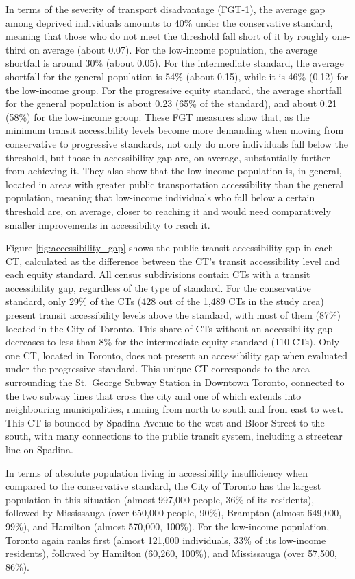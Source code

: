 \documentclass[preprint, 3p,
authoryear]{elsarticle} %
\begin{document}
In terms of the severity of transport disadvantage (FGT-1), the average
gap among deprived individuals amounts to 40\% under the conservative
standard, meaning that those who do not meet the threshold fall short of
it by roughly one-third on average (about 0.07). For the low-income
population, the average shortfall is around 30\% (about 0.05). For the
intermediate standard, the average shortfall for the general population
is 54\% (about 0.15), while it is 46\% (0.12) for the low-income group.
For the progressive equity standard, the average shortfall for the
general population is about 0.23 (65\% of the standard), and about 0.21
(58\%) for the low-income group. These FGT measures show that, as the
minimum transit accessibility levels become more demanding when moving
from conservative to progressive standards, not only do more individuals
fall below the threshold, but those in accessibility gap are, on
average, substantially further from achieving it. They also show that
the low-income population is, in general, located in areas with greater
public transportation accessibility than the general population, meaning
that low-income individuals who fall below a certain threshold are, on
average, closer to reaching it and would need comparatively smaller
improvements in accessibility to reach it.

Figure \ref{fig:accessibility_gap} shows the public transit
accessibility gap in each CT, calculated as the difference between the
CT's transit accessibility level and each equity standard. All census
subdivisions contain CTs with a transit accessibility gap, regardless of
the type of standard. For the conservative standard, only 29\% of the
CTs (428 out of the 1,489 CTs in the study area) present transit
accessibility levels above the standard, with most of them (87\%)
located in the City of Toronto. This share of CTs without an
accessibility gap decreases to less than 8\% for the intermediate equity
standard (110 CTs). Only one CT, located in Toronto, does not present an
accessibility gap when evaluated under the progressive standard. This
unique CT corresponds to the area surrounding the St.~George Subway
Station in Downtown Toronto, connected to the two subway lines that
cross the city and one of which extends into neighbouring
municipalities, running from north to south and from east to west. This
CT is bounded by Spadina Avenue to the west and Bloor Street to the
south, with many connections to the public transit system, including a
streetcar line on Spadina.

In terms of absolute population living in accessibility insufficiency
when compared to the conservative standard, the City of Toronto has the
largest population in this situation (almost 997,000 people, 36\% of its
residents), followed by Mississauga (over 650,000 people, 90\%),
Brampton (almost 649,000, 99\%), and Hamilton (almost 570,000, 100\%).
For the low-income population, Toronto again ranks first (almost 121,000
individuals, 33\% of its low-income residents), followed by Hamilton
(60,260, 100\%), and Mississauga (over 57,500, 86\%).
\end{document}
